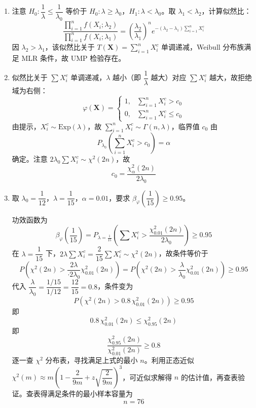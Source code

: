 \begin{solution}
\begin{enumerate}
    \item[(1)] 注意 $H_0: \dfrac{1}{\lambda} \leqslant \dfrac{1}{\lambda_0}$ 等价于 $H_0: \lambda \geqslant \lambda_0$，$H_1: \lambda < \lambda_0$。取 $\lambda_1 < \lambda_2$，计算似然比：
    \[
    \frac{\prod_{i=1}^n f(X_i;\lambda_2)}{\prod_{i=1}^n f(X_i;\lambda_1)} = \left(\frac{\lambda_2}{\lambda_1}\right)^n e^{-(\lambda_2-\lambda_1)\sum_{i=1}^n X_i^c}
    \]
    因 $\lambda_2 > \lambda_1$，该似然比关于 $T(\boldsymbol{X}) = \sum_{i=1}^n X_i^c$ 单调递减，Weibull 分布族满足 MLR 条件，故 UMP 检验存在。

    \item[(2)] 似然比关于 $\sum X_i^c$ 单调递减，$\lambda$ 越小（即 $\dfrac{1}{\lambda}$ 越大）对应 $\sum X_i^c$ 越大，故拒绝域为右侧：
    \[
    \varphi(\boldsymbol{X}) = \begin{cases} 1, & \sum_{i=1}^n X_i^c > c_0 \\ 0, & \sum_{i=1}^n X_i^c \leqslant c_0 \end{cases}
    \]
    由提示，$X_i^c \sim \text{Exp}(\lambda)$，故 $\sum_{i=1}^n X_i^c \sim \Gamma(n,\lambda)$，临界值 $c_0$ 由
    \[
    P_{\lambda_0}\!\left(\sum_{i=1}^n X_i^c > c_0\right) = \alpha
    \]
    确定。注意 $2\lambda_0 \sum X_i^c \sim \chi^2(2n)$，故
    \[
    c_0 = \frac{\chi^2_\alpha(2n)}{2\lambda_0}
    \]

    \item[(3)] 取 $\lambda_0 = \dfrac{1}{12}$，$\lambda = \dfrac{1}{15}$，$\alpha = 0.01$，要求 $\beta_\varphi\!\left(\dfrac{1}{15}\right) \geqslant 0.95$。
    
    功效函数为
    \[
    \beta_\varphi\!\left(\frac{1}{15}\right) = P_{\lambda=\frac{1}{15}}\!\left(\sum X_i^c > \frac{\chi^2_{0.01}(2n)}{2\lambda_0}\right) \geqslant 0.95
    \]
    在 $\lambda = \dfrac{1}{15}$ 下，$2\lambda \sum X_i^c = \dfrac{2}{15}\sum X_i^c \sim \chi^2(2n)$，故条件等价于
    \[
    P\!\left(\chi^2(2n) > \frac{2\lambda}{\cdot 2\lambda_0}\chi^2_{0.01}(2n)\right) = P\!\left(\chi^2(2n) > \frac{\lambda}{\lambda_0}\chi^2_{0.01}(2n)\right) \geqslant 0.95
    \]
    代入 $\dfrac{\lambda}{\lambda_0} = \dfrac{1/15}{1/12} = \dfrac{12}{15} = 0.8$，条件变为
    \[
    P\!\left(\chi^2(2n) > 0.8\,\chi^2_{0.01}(2n)\right) \geqslant 0.95
    \]
    即
    \[
    0.8\,\chi^2_{0.01}(2n) \leqslant \chi^2_{0.95}(2n)
    \]
    即
    \[
    \frac{\chi^2_{0.95}(2n)}{\chi^2_{0.01}(2n)} \geqslant 0.8
    \]
    逐一查 $\chi^2$ 分布表，寻找满足上式的最小 $n$。利用正态近似 $\chi^2(m) \approx m\!\left(1 - \dfrac{2}{9m} + z\sqrt{\dfrac{2}{9m}}\right)^3$，可近似求解得 $n$ 的估计值，再查表验证。查表得满足条件的最小样本容量为
    \[
    n = 76
    \]
\end{enumerate}
\end{solution}
